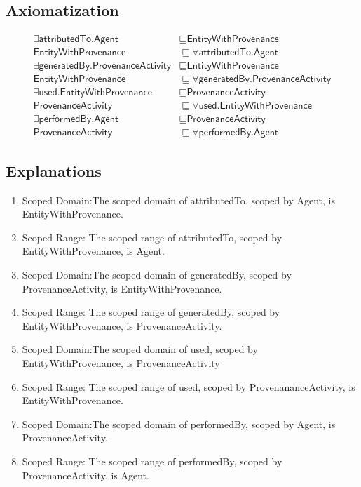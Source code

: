 \subsection{Axiomatization}
\label{axs:Provenance}
\begin{align}
\exists\textsf{attributedTo}.\textsf{Agent} &\sqsubseteq \textsf{EntityWithProvenance}\\
\textsf{EntityWithProvenance} &\sqsubseteq \forall\textsf{attributedTo}.\textsf{Agent}\\
\exists\textsf{generatedBy}.\textsf{ProvenanceActivity} &\sqsubseteq \textsf{EntityWithProvenance}\\
\textsf{EntityWithProvenance} &\sqsubseteq \forall\textsf{generatedBy}.\textsf{ProvenanceActivity}\\
\exists\textsf{used}.\textsf{EntityWithProvenance} &\sqsubseteq \textsf{ProvenanceActivity}\\
\textsf{ProvenanceActivity} &\sqsubseteq \forall\textsf{used}.\textsf{EntityWithProvenance}\\
\exists\textsf{performedBy}.\textsf{Agent} &\sqsubseteq \textsf{ProvenanceActivity}\\
\textsf{ProvenanceActivity} &\sqsubseteq \forall\textsf{performedBy}.\textsf{Agent}
\end{align}

\subsection{Explanations}
\label{exp:Provenance}
\begin{enumerate}
\item Scoped Domain:The scoped domain of \textsf{attributedTo}, scoped by \textsf{Agent}, is \textsf{EntityWithProvenance}.
\item Scoped Range: The scoped range of \textsf{attributedTo}, scoped by \textsf{EntityWithProvenance}, is \textsf{Agent}. 
\item Scoped Domain:The scoped domain of \textsf{generatedBy}, scoped by \textsf{ProvenanceActivity}, is \textsf{EntityWithProvenance}.
\item Scoped Range: The scoped range of \textsf{generatedBy}, scoped by \textsf{EntityWithProvenance}, is \textsf{ProvenanceActivity}.
\item Scoped Domain:The scoped domain of \textsf{used}, scoped by \textsf{EntityWithProvenance}, is \textsf{ProvenanceActivity}
\item Scoped Range: The scoped range of \textsf{used}, scoped by \textsf{ProvenananceActivity}, is \textsf{EntityWithProvenance}.
\item Scoped Domain:The scoped domain of \textsf{performedBy}, scoped by \textsf{Agent}, is \textsf{ProvenanceActivity}.
\item Scoped Range: The scoped range of \textsf{performedBy}, scoped by \textsf{ProvenanceActivity}, is \textsf{Agent}.
\end{enumerate}

